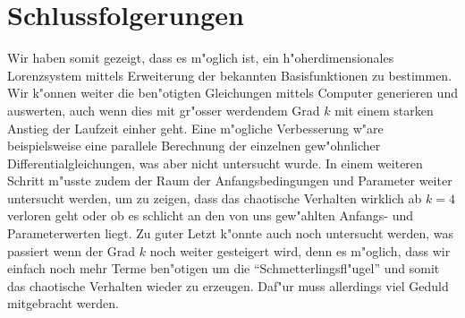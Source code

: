 \section{Schlussfolgerungen}
Wir haben somit gezeigt, dass es m"oglich ist, ein h"oherdimensionales 
Lorenzsystem mittels Erweiterung der bekannten Basisfunktionen zu bestimmen. 
Wir k"onnen weiter die ben"otigten Gleichungen mittels Computer generieren und 
auswerten, auch wenn dies mit gr"osser werdendem Grad $k$ mit einem starken 
Anstieg der Laufzeit einher geht. Eine m"ogliche Verbesserung w"are 
beispielsweise eine parallele Berechnung der einzelnen gew"ohnlicher 
Differentialgleichungen, was aber nicht untersucht wurde. In einem weiteren 
Schritt m"usste zudem der Raum der Anfangsbedingungen und Parameter weiter 
untersucht werden, um zu zeigen, dass das chaotische Verhalten wirklich ab $k = 
4$ verloren geht oder ob es schlicht an den von uns gew"ahlten Anfangs- und 
Parameterwerten liegt. Zu guter Letzt k"onnte auch noch untersucht werden, was 
passiert wenn der Grad $k$ noch weiter gesteigert wird, denn es m"oglich, dass 
wir einfach noch mehr Terme ben"otigen um die ``Schmetterlingsfl"ugel'' und 
somit das chaotische Verhalten wieder zu erzeugen. Daf"ur muss allerdings viel 
Geduld mitgebracht werden.
